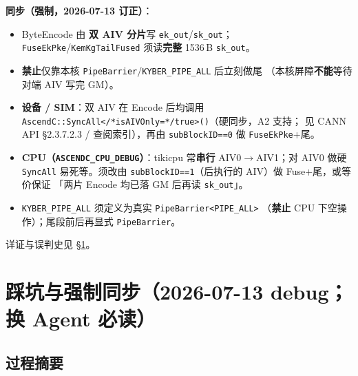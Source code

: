 \documentclass[UTF8,a4paper,11pt]{ctexart}
\begin{document}
\textbf{同步（强制，2026-07-13 订正）}：
\begin{itemize}
  \item ByteEncode 由 \textbf{双 AIV 分片}写 \texttt{ek\_out}/\texttt{sk\_out}；
        \texttt{FuseEkPke}/\texttt{KemKgTailFused} 须读\textbf{完整} 1536\,B \texttt{sk\_out}。
  \item \textbf{禁止}仅靠本核 \texttt{PipeBarrier}/\texttt{KYBER\_PIPE\_ALL} 后立刻做尾
        （本核屏障\textbf{不能}等待对端 AIV 写完 GM）。
  \item \textbf{设备 / SIM}：双 AIV 在 Encode 后均调用
        \texttt{AscendC::SyncAll</*isAIVOnly=*/true>()}（硬同步，A2 支持；
        见 CANN API §2.3.7.2.3 / 查阅索引），再由 \texttt{subBlockID==0} 做
        \texttt{FuseEkPke}+尾。
  \item \textbf{CPU（\texttt{ASCENDC\_CPU\_DEBUG}）}：tikicpu 常\textbf{串行}
        AIV0$\to$AIV1；对 AIV0 做硬 \texttt{SyncAll} 易死等。须改由
        \texttt{subBlockID==1}（后执行的 AIV）做 Fuse+尾，或等价保证
        「两片 Encode 均已落 GM 后再读 \texttt{sk\_out}」。
  \item \texttt{KYBER\_PIPE\_ALL} 须定义为真实 \texttt{PipeBarrier<PIPE\_ALL>}
        （\textbf{禁止} CPU 下空操作）；尾段前后再显式 \texttt{PipeBarrier}。
\end{itemize}
详证与误判史见 \S\ref{sec:landmines}。

\section{踩坑与强制同步（2026-07-13 debug；换 Agent 必读）}
\label{sec:landmines}

\subsection{过程摘要}
\end{document}
